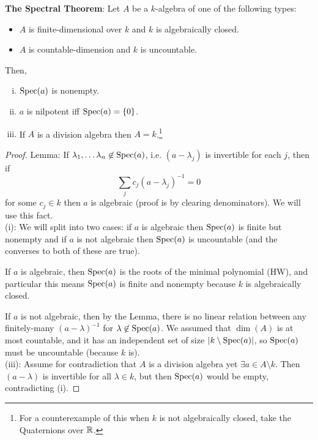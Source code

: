 \documentclass{amsart}
\begin{document}
\textbf{The Spectral Theorem}: Let $A$ be a $k$-algebra of one of the following types:
\begin{itemize}
	\item $A$ is finite-dimensional over $k$ and $k$ is algebraically closed.
	\item $A$ is countable-dimension and $k$ is uncountable.
\end{itemize}
Then,
\begin{enumerate}[(i)]
	\item $\operatorname{Spec}(a)$ is nonempty.
	\item $a$ is nilpotent iff $\operatorname{Spec}(a)=\{0\}$.
	\item If $A$ is a division algebra then $A=k$.\footnote{For a counterexample of this when $k$ is not algebraically closed, take the Quaternions over $\mathbb{R}$.}
\end{enumerate}
\begin{proof}
	Lemma: If $\lambda_1,\dots\lambda_n\not\in \operatorname{Spec}(a)$, i.e. $(a-\lambda_j)$ is invertible for each $j$, then if 
	$$
	\sum_j c_j(a-\lambda_j)^{-1} = 0
	$$
	for some $c_j\in k$ then $a$ is algebraic (proof is by clearing denominators). We will use this fact.\\
	
	(i): We will split into two cases: if $a$ is algebraic then $\operatorname{Spec}(a)$ is finite but nonempty and if $a$ is not algebraic then $\operatorname{Spec}(a)$ is uncountable (and the converses to both of these are true).
	
	If $a$ is algebraic, then $\operatorname{Spec}(a)$ is the roots of the minimal polynomial (HW), and particular this means $\operatorname{Spec}(a)$ is finite and nonempty because $k$ is algebraically closed.
	
	If $a$ is not algebraic, then by the Lemma, there is no linear relation between any finitely-many $(a-\lambda)^{-1}$ for $\lambda\not\in \operatorname{Spec}(a)$. We assumed that $\dim(A)$ is at most countable, and it has an independent set of size $|k\setminus \operatorname{Spec}(a)|$, so $\operatorname{Spec}(a)$ must be uncountable (because $k$ is).\\
	
	(iii): Assume for contradiction that $A$ is a division algebra yet $\exists a\in A\setminus k$. Then $(a-\lambda)$ is invertible for all $\lambda \in k$, but then $\operatorname{Spec}(a)$ would be empty, contradicting (i).
\end{proof}
\end{document}
